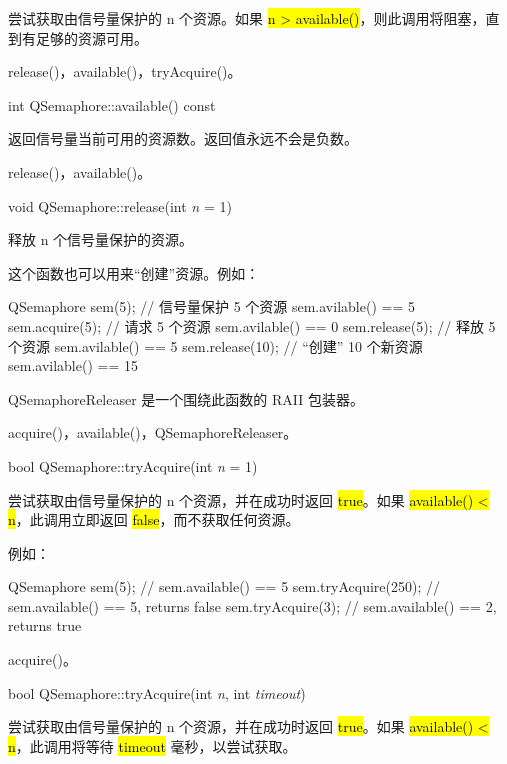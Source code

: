 尝试获取由信号量保护的 n 个资源。如果 \hl{n > available()}，则此调用将阻塞，直到有足够的资源可用。

\begin{seeAlso}
release()，available()，tryAcquire()。
\end{seeAlso}

int QSemaphore::available() const

返回信号量当前可用的资源数。返回值永远不会是负数。

\begin{seeAlso}
release()，available()。
\end{seeAlso}

void QSemaphore::release(int \emph{n} = 1)

释放 n 个信号量保护的资源。

这个函数也可以用来“创建”资源。例如：

\begin{cppcode}
QSemaphore sem(5);      // 信号量保护 5 个资源  sem.avilable() == 5
sem.acquire(5);         // 请求 5 个资源       sem.avilable() == 0
sem.release(5);         // 释放 5 个资源       sem.avilable() == 5
sem.release(10);        // “创建” 10 个新资源  sem.avilable() == 15
\end{cppcode}

QSemaphoreReleaser 是一个围绕此函数的 RAII 包装器。

\begin{seeAlso}
acquire()，available()，QSemaphoreReleaser。
\end{seeAlso}

bool QSemaphore::tryAcquire(int \emph{n} = 1)

尝试获取由信号量保护的 n 个资源，并在成功时返回 \hl{true}。如果 \hl{available() < n}，此调用立即返回 \hl{false}，而不获取任何资源。

例如：

\begin{cppcode}
QSemaphore sem(5);      // sem.available() == 5
sem.tryAcquire(250);    // sem.available() == 5, returns false
sem.tryAcquire(3);      // sem.available() == 2, returns true
\end{cppcode}

\begin{seeAlso}
acquire()。
\end{seeAlso}

bool QSemaphore::tryAcquire(int \emph{n}, int \emph{timeout})

尝试获取由信号量保护的 n 个资源，并在成功时返回 \hl{true}。如果 \hl{available() < n}，此调用将等待 \hl{timeout} 毫秒，以尝试获取。

